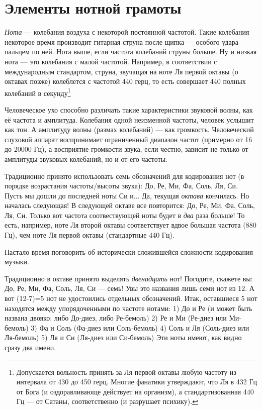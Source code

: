 \chapter{Элементы нотной грамоты}
\label{ch:note}

\emph{Нота} --- колебания воздуха с некоторой постоянной частотой. Такие колебания некоторое время производит гитарная струна после щипка --- особого удара пальцем по ней. Нота выше, если частота колебаний струны больше. Ну и низкая нота --- это колебания с малой частотой. Например, в соответствии с международным стандартом, струна, звучащая на ноте Ля первой октавы (о октавах позже) колеблется с частотой 440 герц, то есть совершает 440 полных колебаний в секунду\footnote{Допускается вольность принять за Ля первой октавы любую частоту из интервала от 430 до 450 герц. Многие фанатики утверждают, что Ля в 432 Гц от Бога (и оздоравливающе действует на организм), а стандартизованная 440 Гц --- от Сатаны, соответственно (и разрушает психику).}

Человеческое ухо способно различать такие характеристики звуковой волны, как её частота и амплитуда. Колебания одной неизменной частоты, человек услышит как тон. А амплитуду волны (размах колебаний) --- как громкость. Человеческий слуховой аппарат воспринимает ограниченный диапазон частот (примерно от 16 до 20000 Гц), а восприятие громкости звука, если честно, зависит не только от амплитуды звуковых колебаний, но и от его частоты.

Традиционно принято использовать семь обозначений для кодирования нот (в порядке возрастания частоты/высоты звука): До, Ре, Ми, Фа, Соль, Ля, Си. Пусть мы дошли до последней ноты Си и... Да, текущая \emph{октава} кончилась. Но началась следующая! В следующей октаве все повторится: До, Ре, Ми, Фа, Соль, Ля, Си. Только вот частота соотвествующей ноты будет в \emph{два} раза больше! То есть, например, ноте Ля второй октавы соответствует вдвое большая частота (880 Гц), чем ноте Ля первой октавы (стандартные 440 Гц).

Настало время поговорить об исторически сложившейся сложности кодирования музыки.

Традиционно в октаве принято выделять \emph{двенадцать} нот! Погодите, скажете вы: До, Ре, Ми, Фа, Соль, Ля, Си --- семь! Увы это названия лишь семи нот из 12. А вот (12-7)=5 нот не удостоились отдельных обозначений. Итак, оставшиеся 5 нот находятся между упорядоченными по частоте нотами:
1) До и Ре (и может быть названа двояко: либо До-диез, либо Ре-бемоль)
2) Ре и Ми (Ре-диез или Ми-бемоль)
3) Фа и Соль (Фа-диез или Соль-бемоль)
4) Соль и Ля (Соль-диез или Ля-бемоль)
5) Ля и Си (Ля-диез или Си-бемоль)
Эти ноты имеют, как видно сразу два имени.

